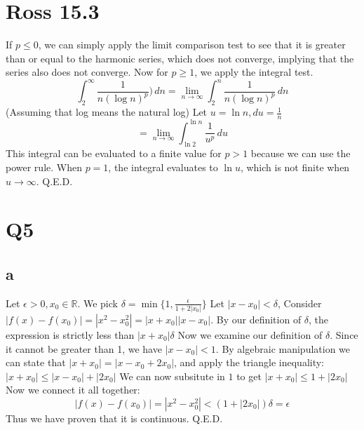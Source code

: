 \documentclass[12pt]{article}
\newcommand{\R}{\mathbb{R}}
\begin{document}
\section{Ross 15.3}
If $p\leq0$, we can simply apply the limit comparison test to see that it is greater than or equal to the harmonic series, which does not converge, implying that the series also does not converge.
\newline
Now for $p \geq 1$, we apply the integral test.
$$\int_{2}^{\infty}\frac{1}{n(\log n)^p}) \,dn = \lim _{n \to \infty} \int_{2}^{n}\frac{1}{n(\log n)^p} \,dn$$
(Assuming that log means the natural log) Let $u = \ln n, du = \frac{1}{n}$
$$= \lim _{n \to \infty} \int_{\ln 2}^{\ln n} \frac{1}{u^p} \,du$$
This integral can be evaluated to a finite value for $p>1$ because we can use the power rule. When $p = 1$, the integral evaluates to $\ln u$, which is not finite when $u \to \infty$.
\newline
Q.E.D.
\newpage


\section{Q5}
\subsection{a}
Let $\epsilon > 0, x_0 \in \R$. We pick $\delta = \min \{1, \frac{\epsilon}{1+2|x_0|}\}$
\newline
Let $|x-x_0|<\delta$, Consider $|f(x)-f(x_0)| = |x^2-x_0^2| = |x+x_0||x-x_0|$. By our definition of $\delta$, the expression is strictly less than $|x+x_0|\delta$
\newline
Now we examine our definition of $\delta$. Since it cannot be greater than 1, we have $|x-x_0|<1$. By algebraic manipulation we can state that $|x+x_0|=|x-x_0+2x_0|$, and apply the triangle inequality: $|x+x_0|\leq |x-x_0|+|2x_0|$
\newline
We can now subsitute in $1$ to get $|x+x_0|\leq 1+|2x_0|$
\newline
Now we connect it all together:
$$|f(x)-f(x_0)| = |x^2-x_0^2| < (1+|2x_0|)\delta = \epsilon$$
Thus we have proven that it is continuous.
\newline
Q.E.D.
\end{document}
